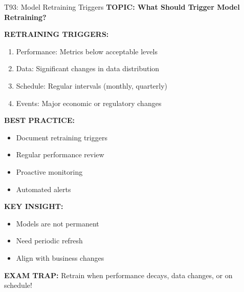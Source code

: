\documentclass[8pt]{beamer}
\begin{document}
	\begin{frame}{T93: Model Retraining Triggers}
		\fontsize{6.5}{7.5}\selectfont
		\textbf{TOPIC: What Should Trigger Model Retraining?}
		
		\vspace{0.1cm}
		\textbf{RETRAINING TRIGGERS:}
		\begin{enumerate}
			\item \textcolor{myblue}{Performance:} Metrics below acceptable levels
			\item \textcolor{myblue}{Data:} Significant changes in data distribution
			\item \textcolor{myblue}{Schedule:} Regular intervals (monthly, quarterly)
			\item \textcolor{myblue}{Events:} Major economic or regulatory changes
		\end{enumerate}
		
		\vspace{0.1cm}
		\textbf{BEST PRACTICE:}
		\begin{itemize}
			\item Document retraining triggers
			\item Regular performance review
			\item Proactive monitoring
			\item Automated alerts
		\end{itemize}
		
		\vspace{0.1cm}
		\textbf{KEY INSIGHT:}
		\begin{itemize}
			\item Models are not permanent
			\item Need periodic refresh
			\item Align with business changes
		\end{itemize}
		
		\textcolor{myred}{\textbf{EXAM TRAP:}} Retrain when \textcolor{myblue}{performance decays, data changes, or on schedule}!
	\end{frame}
	
\end{document}
